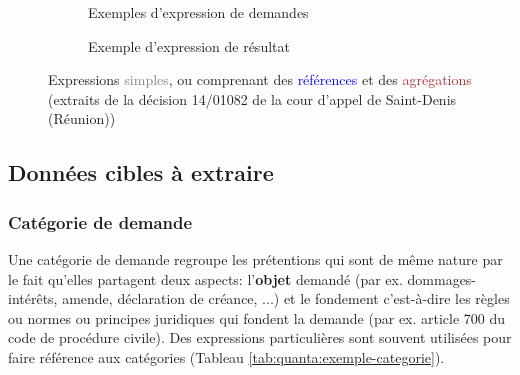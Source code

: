 \begin{figure}[h]
\scriptsize
\begin{subfigure}[t]{0.9\textwidth}
\caption{Exemples d'expression de demandes}\label{fig:quanta:expr-dmd}
\end{subfigure} 


\begin{subfigure}[t]{0.9\textwidth}
\caption{Exemple d'expression de résultat}\label{fig:quanta:expr-rst}
\end{subfigure}
\caption{Expressions \textcolor{gray}{simples}, ou comprenant des  \textcolor{blue}{références} et  des \textcolor{brown}{agrégations} (extraits de la décision 14/01082 de la cour d'appel de Saint-Denis (Réunion))}\label{fig:quanta:expr-dmd-rst}
\end{figure}

\subsection{Données cibles à extraire}
\subsubsection{Catégorie de demande}
Une catégorie de demande regroupe les prétentions qui sont de même nature par le fait qu'elles partagent deux aspects: l'\textbf{objet} demandé (par ex. dommages-intérêts, amende, déclaration de créance, ...) et le fondement c'est-à-dire les règles ou normes ou principes juridiques qui fondent la demande (par ex. article 700 du code de procédure civile). Des expressions particulières sont souvent utilisées pour faire référence aux catégories (Tableau \ref{tab:quanta:exemple-categorie}).

